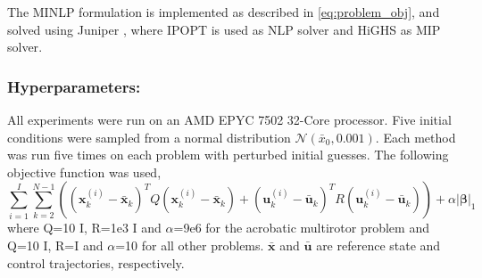 The MINLP formulation is implemented as described in  \ref{eq:problem_obj}, and solved using Juniper \cite{juniper}, where IPOPT is used as NLP solver and HiGHS as MIP solver\cite{Wachter2006, huangfu2018parallelizing}.
\subsubsection{Hyperparameters:} All experiments were run on an AMD EPYC 7502 32-Core processor. Five initial conditions were sampled from a normal distribution $\mathcal{N}(\bar{x}_0, 0.001)$. Each method was run five times on each problem with perturbed initial guesses. The following objective function was used, 
\begin{equation}\label{eq:obj_func}
    \sum_{i=1}^I\sum_{k=2}^{N-1} \left( (\textbf{x}_k^{(i)} - \bar{\textbf{x}}_k)^T Q (\textbf{x}_k^{(i)} - \bar{\textbf{x}}_k) + (\textbf{u}_k^{(i)} - \bar{\textbf{u}}_k)^T R (\textbf{u}_k^{(i)} - \bar{\textbf{u}}_k) \right) + \alpha\left|\boldsymbol{\beta}\right|_1
\end{equation}
where Q=10 I, R=1e3 I and $\alpha$=9e6 for the acrobatic multirotor problem and Q=10 I, R=I and $\alpha$=10 for all other problems. $\bar{\textbf{x}}$ and $\bar{\textbf{u}}$ are reference state and control trajectories, respectively.
